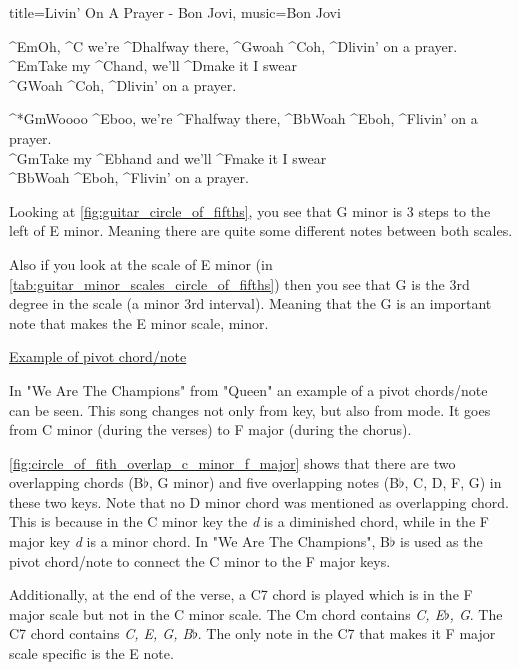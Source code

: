 \begin{song}[verse/numbered, align-chords=l]{title={Livin' On A Prayer - Bon Jovi}, music={Bon Jovi}}
	\begin{chorus}
		^{Em}Oh, ^{C} we're ^{D}halfway there, ^{G}woah ^{C}oh, ^{D}livin' on a prayer. \\
		^{Em}Take my ^{C}hand, we'll ^{D}make it I swear \\
		^{G}Woah ^{C}oh, ^{D}livin' on a prayer. \\
	\end{chorus}
	
	\begin{outro-chorus}
		^*{Gm}Woooo ^{Eb}oo, we're ^{F}halfway there, ^{Bb}Woah ^{Eb}oh, ^{F}livin' on a prayer. \\
		^{Gm}Take my ^{Eb}hand and we'll ^{F}make it I swear \\
		^{Bb}Woah ^{Eb}oh, ^{F}livin' on a prayer. \\
	\end{outro-chorus}
\end{song}

Looking at \autoref{fig:guitar_circle_of_fifths}, you see that G minor is 3 steps to the left of E minor. Meaning there are quite some different notes between both scales.

Also if you look at the scale of E minor (in \autoref{tab:guitar_minor_scales_circle_of_fifths}) then you see that G is the 3rd degree in the scale (a minor 3rd interval). Meaning that the G is an important note that makes the E minor scale, minor.

\newpage

\underline{Example of pivot chord/note}

In "We Are The Champions" from "Queen" an example of a pivot chords/note can be seen. This song changes not only from key, but also from mode. It goes from C minor (during the verses) to F major (during the chorus).

\autoref{fig:circle_of_fith_overlap_c_minor_f_major} shows that there are two overlapping chords (B$\flat$, G minor) and five overlapping notes (B$\flat$, C, D, F, G) in these two keys. Note that no D minor chord was mentioned as overlapping chord. This is because in the C minor key the \textit{d} is a diminished chord, while in the F major key \textit{d} is a minor chord. In "We Are The Champions", B$\flat$ is used as the pivot chord/note to connect the C minor to the F major keys.

Additionally, at the end of the verse, a C7 chord is played which is in the F major scale but not in the C minor scale. The Cm chord contains \textit{C, E$\flat$, G}. The C7 chord contains \textit{C, E, G, B$\flat$}. The only note in the C7 that makes it F major scale specific is the E note.

